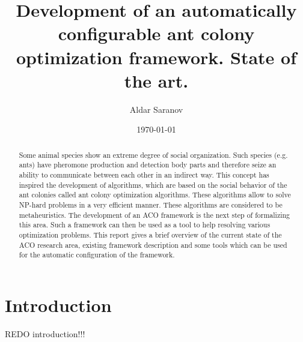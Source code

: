 \documentclass[12pt]{article}
\author{Aldar Saranov}
\date{\today}
\title{Development of an automatically configurable ant colony optimization framework. State of the art.}
\begin{document}
\maketitle 
\newpage

\tableofcontents
\newpage

\begin{abstract}
Some animal species show an extreme degree of social organization. Such species (e.g. ants) have pheromone production and detection body parts and therefore seize an ability to communicate between each other in an indirect way. This concept has inspired the development of algorithms, which are based on the social behavior of the ant colonies called ant colony optimization algorithms. These algorithms allow to solve NP-hard problems in a very efficient manner. These algorithms are considered to be metaheuristics. The development of an ACO framework is the next step of formalizing this area. Such a framework can then be used as a tool to help resolving various optimization problems. This report gives a brief overview of the current state of the ACO research area, existing framework description and some tools which can be used for the automatic configuration of the framework.
\end{abstract}




\section{Introduction}

REDO introduction!!!
\end{document}
